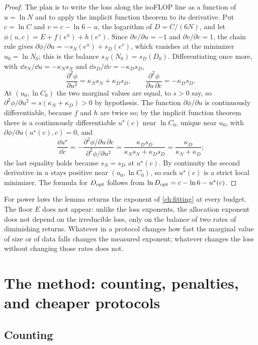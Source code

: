 \begin{refsection}
\begin{proof}
The plan is to write the loss along the isoFLOP line as a function of $u=\ln N$ and to apply the implicit function theorem to its derivative. Put $c=\ln C$ and $v=c-\ln6-u$, the logarithm of $D=C/(6N)$, and let $\phi(u,c)=E+f(e^u)+h(e^v)$. Since $\partial v/\partial u=-1$ and $\partial v/\partial c=1$, the chain rule gives $\partial\phi/\partial u=-s_N(e^u)+s_D(e^v)$, which vanishes at the minimizer $u_0=\ln N_0$; this is the balance $s_N(N_0)=s_D(D_0)$. Differentiating once more, with $\dd s_N/\dd u=-\kappa_Ns_N$ and $\dd s_D/\dd v=-\kappa_Ds_D$,
\[
\frac{\partial^2\phi}{\partial u^2}=\kappa_Ns_N+\kappa_Ds_D,\qquad\frac{\partial^2\phi}{\partial u\,\partial c}=-\kappa_Ds_D .
\]
At $(u_0,\ln C_0)$ the two marginal values are equal, to $s>0$ say, so $\partial^2\phi/\partial u^2=s(\kappa_N+\kappa_D)>0$ by hypothesis. The function $\partial\phi/\partial u$ is continuously differentiable, because $f$ and $h$ are twice so; by the implicit function theorem there is a continuously differentiable $u^\star(c)$ near $\ln C_0$, unique near $u_0$, with $\partial\phi/\partial u(u^\star(c),c)=0$, and
\[
\frac{\dd u^\star}{\dd c}=-\frac{\partial^2\phi/\partial u\,\partial c}{\partial^2\phi/\partial u^2}=\frac{\kappa_Ds_D}{\kappa_Ns_N+\kappa_Ds_D}=\frac{\kappa_D}{\kappa_N+\kappa_D};
\]
the last equality holds because $s_N=s_D$ at $u^\star(c)$. By continuity the second derivative in $u$ stays positive near $(u_0,\ln C_0)$, so each $u^\star(c)$ is a strict local minimizer. The formula for $D_{\mathrm{opt}}$ follows from $\ln D_{\mathrm{opt}}=c-\ln6-u^\star(c)$.
\end{proof}

For power laws the lemma returns the exponent of \cref{ch:fitting} at every budget. The floor $E$ does not appear: unlike the loss exponents, the allocation exponent does not depend on the irreducible loss, only on the balance of two rates of diminishing returns. Whatever in a protocol changes how fast the marginal value of size or of data falls changes the measured exponent; whatever changes the loss without changing those rates does not.

\section{The method: counting, penalties, and cheaper protocols}\label{sec:protocol:counting}

\subsection*{Counting}


\end{refsection}
